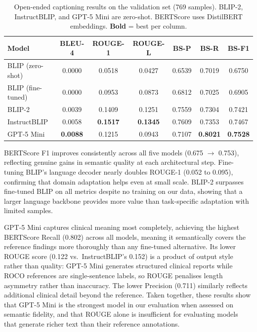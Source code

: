\documentclass{article}
\begin{document}
\begin{table}[h]
  \caption{Open-ended captioning results on the validation set (769 samples).
           BLIP-2, InstructBLIP, and GPT-5 Mini are zero-shot. BERTScore uses
           DistilBERT embeddings. \textbf{Bold} = best per column.}
  \label{tab:captioning-results}
  \centering
  \small
  \begin{tabular}{lcccccc}
    \toprule
    Model & BLEU-4 & ROUGE-1 & ROUGE-L & BS-P & BS-R & BS-F1 \\
    \midrule
    BLIP (zero-shot)             & 0.0000 & 0.0518 & 0.0427 & 0.6539 & 0.7019 & 0.6750 \\
    BLIP (fine-tuned)            & 0.0000 & 0.0953 & 0.0873 & 0.6812 & 0.7025 & 0.6905 \\
    BLIP-2           & 0.0039 & 0.1409 & 0.1251 & 0.7559 & 0.7304 & 0.7421 \\
    InstructBLIP     & 0.0058 & \textbf{0.1517} & \textbf{0.1345} & 0.7609 & 0.7353 & 0.7467 \\
    GPT-5 Mini       & \textbf{0.0088} & 0.1215 & 0.0943 & 0.7107 & \textbf{0.8021} & \textbf{0.7528} \\
    \bottomrule
  \end{tabular}
\end{table}
BERTScore F1 improves consistently across all five models (0.675 $\to$ 0.753),
reflecting genuine gains in semantic quality at each architectural step.
Fine-tuning BLIP's language decoder nearly doubles ROUGE-1 (0.052 to 0.095),
confirming that domain adaptation helps even at small scale. BLIP-2 surpasses
fine-tuned BLIP on all metrics despite no training on our data, showing that a
larger language backbone provides more value than task-specific adaptation with
limited samples.

GPT-5 Mini captures clinical meaning most completely, achieving the highest
BERTScore Recall (0.802) across all models, meaning it semantically covers the
reference findings more thoroughly than any fine-tuned alternative. Its lower
ROUGE score (0.122 vs.\ InstructBLIP's 0.152) is a product of output style
rather than quality: GPT-5 Mini generates structured clinical reports while
ROCO references are single-sentence labels, so ROUGE penalises length
asymmetry rather than inaccuracy. The lower Precision (0.711) similarly
reflects additional clinical detail beyond the reference. Taken together, these
results show that GPT-5 Mini is the strongest model in our evaluation when
assessed on semantic fidelity, and that ROUGE alone is insufficient for
evaluating models that generate richer text than their reference annotations.
\end{document}

